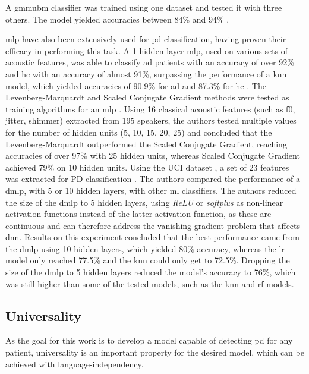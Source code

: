 A \gls{gmmubm} classifier was trained using one dataset and tested it with three others. The model yielded accuracies between 84\% and 94\% \cite{parkinson_phonemic_relevance}.

\gls{mlp} have also been extensively used for \gls{pd} classification, having proven their efficacy in performing this task. A 1 hidden layer \gls{mlp}, used on various sets of acoustic features, was able to classify \gls{ad} patients with an accuracy of over 92\% and \gls{hc} with an accuracy of almost 91\%, surpassing the performance of a \gls{knn} model, which yielded accuracies of 90.9\% for \gls{ad} and 87.3\% for \gls{hc} \cite{alzheimer_2014_1}. The Levenberg-Marquardt and Scaled Conjugate Gradient methods were tested as training algorithms for an \gls{mlp} \cite{parkinson_mlp}. Using 16 classical acoustic features (such as \gls{f0}, jitter, shimmer) extracted from 195 speakers, the authors tested multiple values for the number of hidden units (5, 10, 15, 20, 25) and concluded that the Levenberg-Marquardt outperformed the Scaled Conjugate Gradient, reaching accuracies of over 97\% with 25 hidden units, whereas Scaled Conjugate Gradient achieved 79\% on 10 hidden units. Using the UCI dataset \cite{UCI}, a set of 23 features was extracted for PD classification \cite{deep_mlp_parkinson}. The authors compared the performance of a \gls{dmlp}, with 5 or 10 hidden layers, with other \gls{ml} classifiers. The authors reduced the size of the \gls{dmlp} to 5 hidden layers, using \textit{ReLU} or \textit{softplus} as non-linear activation functions instead of the latter activation function, as these are continuous and can therefore address the vanishing gradient problem that affects \gls{dnn}. Results on this experiment concluded that the best performance came from the \gls{dmlp} using 10 hidden layers, which yielded 80\% accuracy, whereas the \gls{lr} model only reached 77.5\% and the \gls{knn} could only get to 72.5\%. Dropping the size of the \gls{dmlp} to 5 hidden layers reduced the model's accuracy to 76\%, which was still higher than some of the tested models, such as the \gls{knn} and \gls{rf} models.

\subsection{Universality}

As the goal for this work is to develop a model capable of detecting \gls{pd} for any patient, universality is an important property for the desired model, which can be achieved with language-independency. 

